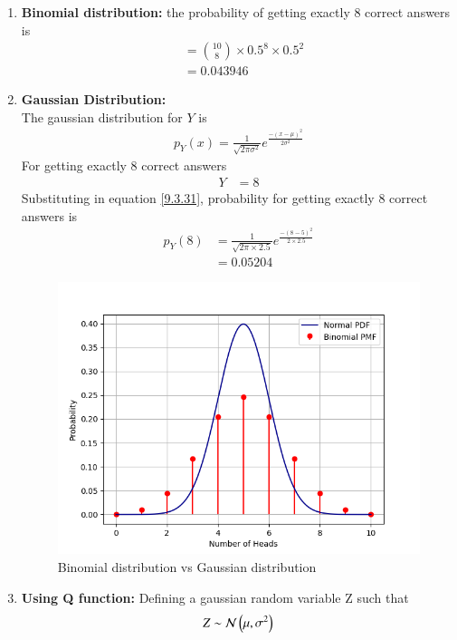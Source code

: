 \documentclass[journal,12pt,onecolumn]{IEEEtran}
\theoremstyle{remark}
\begin{document}
\begin{enumerate}
\item \textbf{Binomial distribution:} 
the probability of getting exactly 8 correct answers is 
\begin{align}
	&= \binom{10}{8} \times 0.5^8\times 0.5^{2}\\
	&= 0.043946
\end{align}
\item \textbf{Gaussian Distribution:}\\
The gaussian distribution for $Y$ is
\begin{align}
	p_Y(x) = \frac{1}{\sqrt{2\pi\sigma^2}}e^{\frac{-(x-\mu)^2}{2\sigma^2}}\label{9.3.31}
\end{align}
For getting exactly 8 correct answers
\begin{align}
	Y &= 8
\end{align}
Substituting in equation \eqref{9.3.31}, probability for getting exactly 8 correct answers is
\begin{align}
	p_Y(8) &= \frac{1}{\sqrt{2\pi\times2.5}}e^{\frac{-(8-5)^2}{2\times2.5}}\\
	&= 0.05204
\end{align}
\begin{figure}[H]
\includegraphics[width=\columnwidth]{ncert/9/3/30/figs/fig.png}
\caption{Binomial distribution vs Gaussian distribution}
	\label{fig58:_9_3_31}
\end{figure}
\item \textbf{Using Q function:}
Defining a gaussian random variable Z such that
\begin{align}
	Z \sim \gauss{\mu}{\sigma^2}

\end{align}
\end{enumerate}
\end{document}
